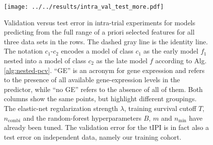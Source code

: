 \begin{figure}
    \centering
    \texttt{[image: ../../results/intra\_val\_test\_more.pdf]}
    \caption{Validation versus test error in intra-trial experiments for models predicting from the 
        full range of a priori selected features for all three data sets in the rows. The dashed 
        gray line is the identity line. The notation 
        $c_1$-$c_2$ encodes a model of class $c_1$ as the early model $f_1$ nested into a model of 
        class $c_2$ as the late model $f$ according to Alg. \ref{alg:nested-pcv}.
        ``GE'' is an acronym for gene expression and refers to the presence of all available 
        gene-expression levels in the predictor, while ``no GE'' refers to the absence of all of 
        them. Both columns show 
        the same points, but highlight different groupings. The elastic-net 
        regularization strength $\lambda$, training survival cutoff $T$, $n_\text{combi}$ and the 
        random-forest hyperparameters $B$, $m$ and $n_\text{min}$ have already been tuned. The 
        validation error for the $\text{tIPI}$ is in fact also a test error on independent data, 
        namely our training cohort.}
    \label{fig:intra-val-test-more}
\end{figure}